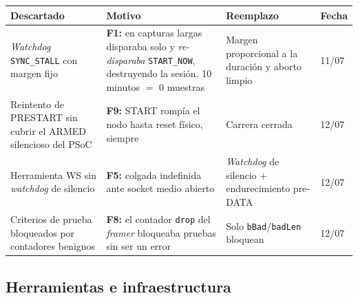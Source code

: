 \begin{center}\footnotesize
\begin{tabularx}{\textwidth}{@{}l X X l@{}}
\toprule
\textbf{Descartado} & \textbf{Motivo} & \textbf{Reemplazo} & \textbf{Fecha} \\
\midrule
\emph{Watchdog} \texttt{SYNC\_STALL} con margen fijo
& \textbf{F1:} en capturas largas disparaba solo y \emph{re-disparaba} \texttt{START\_NOW}, destruyendo la sesi\'on. 10 minutos $=$ 0 muestras
& Margen proporcional a la duraci\'on y aborto limpio
& 11/07 \\
\addlinespace[2pt]
Reintento de PRESTART sin cubrir el ARMED silencioso del PSoC
& \textbf{F9:} START romp\'ia el nodo hasta reset f\'isico, siempre
& Carrera cerrada
& 12/07 \\
\addlinespace[2pt]
Herramienta WS sin \emph{watchdog} de silencio
& \textbf{F5:} colgada indefinida ante socket medio abierto
& \emph{Watchdog} de silencio $+$ endurecimiento pre-DATA
& 12/07 \\
\addlinespace[2pt]
Criterios de prueba bloqueados por contadores benignos
& \textbf{F8:} el contador \texttt{drop} del \emph{framer} bloqueaba pruebas sin ser un error
& Solo \texttt{bBad}/\texttt{badLen} bloquean
& 12/07 \\
\bottomrule
\end{tabularx}
\end{center}

\subsection{Herramientas e infraestructura}

